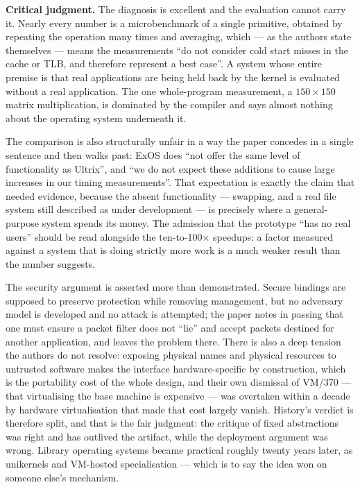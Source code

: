 \textbf{Critical judgment.}
The diagnosis is excellent and the evaluation cannot carry it. Nearly every number is a
microbenchmark of a single primitive, obtained by repeating the operation many times and
averaging, which --- as the authors state themselves --- means the measurements ``do not
consider cold start misses in the cache or TLB, and therefore represent a best case''. A
system whose entire premise is that real applications are being held back by the kernel is
evaluated without a real application. The one whole-program measurement, a $150\times150$
matrix multiplication, is dominated by the compiler and says almost nothing about the
operating system underneath it.

The comparison is also structurally unfair in a way the paper concedes in a single sentence
and then walks past: ExOS does ``not offer the same level of functionality as Ultrix'', and
``we do not expect these additions to cause large increases in our timing measurements''.
That expectation is exactly the claim that needed evidence, because the absent functionality
--- swapping, and a real file system still described as under development --- is precisely
where a general-purpose system spends its money. The admission that the prototype ``has no
real users'' should be read alongside the ten-to-100$\times$ speedups: a factor measured
against a system that is doing strictly more work is a much weaker result than the number
suggests.

The security argument is asserted more than demonstrated. Secure bindings are supposed to
preserve protection while removing management, but no adversary model is developed and no
attack is attempted; the paper notes in passing that one must ensure a packet filter does not
``lie'' and accept packets destined for another application, and leaves the problem there.
There is also a deep tension the authors do not resolve: exposing physical names and physical
resources to untrusted software makes the interface hardware-specific by construction, which
is the portability cost of the whole design, and their own dismissal of VM/370 --- that
virtualising the base machine is expensive --- was overtaken within a decade by hardware
virtualisation that made that cost largely vanish. History's verdict is therefore split, and
that is the fair judgment: the critique of fixed abstractions was right and has outlived the
artifact, while the deployment argument was wrong. Library operating systems became practical
roughly twenty years later, as unikernels and VM-hosted specialisation --- which is to say the
idea won on someone else's mechanism.

